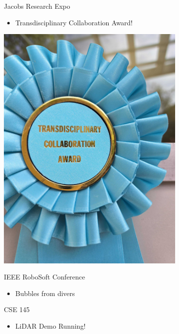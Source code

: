 \begin{frame}{Jacobs Research Expo}
    \begin{itemize}
        \item Transdisciplinary Collaboration Award!
    \end{itemize}    
    \centering
    \includegraphics[height=0.7\textheight,width=0.7\textwidth,keepaspectratio]{images/FishSenseAward.jpg}
\end{frame}

\begin{frame}{IEEE RoboSoft Conference}
    \begin{itemize}
        \item Bubbles from divers 
    \end{itemize}    
\end{frame}

\begin{frame}{CSE 145}
    \begin{itemize}
        \item LiDAR Demo Running!
    \end{itemize}    
\end{frame}

